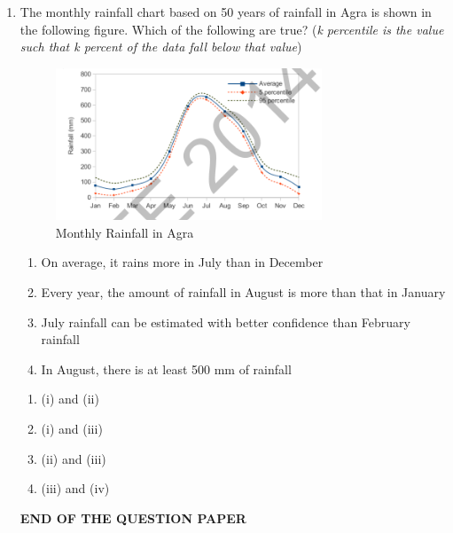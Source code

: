 \documentclass[journal,12pt,onecolumn]{IEEEtran}
\theoremstyle{remark}
\begin{document}
\begin{enumerate}
\begin{multicols}{4}
\begin{enumerate}
\item 3.0
\item 2.5
\item 1.5
\item 1.25
\end{enumerate}
\end{multicols}
\item The monthly rainfall chart based on 50 years of rainfall in Agra is shown in the following figure. Which of the following are true? (\textit{k percentile is the value such that k percent of the data fall below that value}) \hfill{}
\begin{figure}[H]
\centering
\includegraphics[width=0.75\textwidth]{figs/image2.png}
\caption{Monthly Rainfall in Agra}
\label{fig:monthly-rainfall-agra}
\end{figure}

\begin{enumerate}
\item On average, it rains more in July than in December
\item Every year, the amount of rainfall in August is more than that in January
\item July rainfall can be estimated with better confidence than February rainfall
\item In August, there is at least 500 mm of rainfall
\end{enumerate}

\begin{multicols}{4}

\begin{enumerate}
\item (i) and (ii)
\item (i) and (iii)
\item (ii) and (iii)
\item (iii) and (iv)
\end{enumerate}
\end{multicols}


\vspace{2 cm}

\begin{center}
    \textbf{END OF THE QUESTION PAPER}
\end{center}

\end{enumerate}
\end{document}
